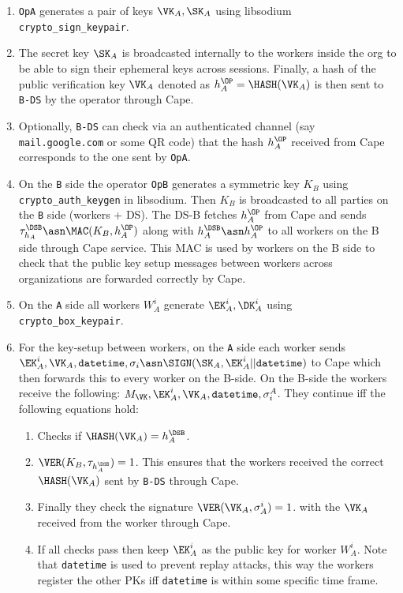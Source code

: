 \begin{enumerate}
  \item \verb|OpA| generates a pair of keys $\VK_A, \SK_A$
  using libsodium \verb|crypto_sign_keypair|.
  \item The secret key $\SK_A$ is broadcasted internally to the workers
  inside the org to be able to sign their ephemeral keys across sessions.
  Finally, a hash of the public verification key $\VK_A$
  denoted as $h_A^\OP = \HASH(\VK_A)$
  is then sent to \verb|B-DS| by the operator through Cape.
  \item Optionally, \verb|B-DS| can check via an authenticated channel (say \verb|mail.google.com|
  or some QR code) that the hash $h_A^\OP$ received from Cape corresponds to the one sent by \verb|OpA|.

  \item On the \verb|B| side the operator \verb|OpB| generates a symmetric key $K_B$
  using \verb|crypto_auth_keygen| in libsodium.
  Then $K_B$ is broadcasted to all parties on the \verb|B| side (workers +
  DS). The DS-B fetches $h_A^\OP$ from Cape and sends $\tau_{h_A}^\DSB \asn
  \MAC(K_B, h_A^\OP)$ along with $h_A^\DSB \asn h_A^\OP$ to all workers on the B side
  through Cape service. This MAC is used by workers on the B side to check
  that the public key setup messages between workers across organizations are
  forwarded correctly by Cape.

  \item On the \verb|A| side all workers $W_A^i$ generate $\EK_A^i, \DK_A^i$
  using \verb|crypto_box_keypair|.

  \item For the key-setup between workers, on the \verb|A| side each worker
  sends $\EK_A^i, \VK_A, \verb|datetime|, \sigma_i \asn \SIGN(\SK_A, \EK_A^i
  || \verb|datetime|)$ to Cape which then forwards this to every worker on
  the B-side. On the B-side the workers receive the following: $M_\VK,
  \EK_A^i, \VK_A, \verb|datetime|, \sigma^A_i$.
  They continue iff the following equations hold:

  \begin{enumerate}
    \item Checks if $\HASH(\VK_A) = h_A^\DSB$.
    \item $\VER(K_B, \tau_{h_A^\DSB}) = 1$. This ensures that the workers
    received the correct $\HASH(\VK_A)$ sent by \verb|B-DS| through Cape.

    \item Finally they check the signature $\VER(\VK_A, \sigma^i_A) = 1$.
    with the $\VK_A$ received from the worker through Cape.
    \item If all checks pass then keep $\EK_A^i$ as the public key for worker $W_A^i$.
    Note that \verb|datetime| is used to prevent replay attacks, this way the workers
    register the other PKs iff \verb|datetime| is within some specific time frame.
  \end{enumerate}


\end{enumerate}
